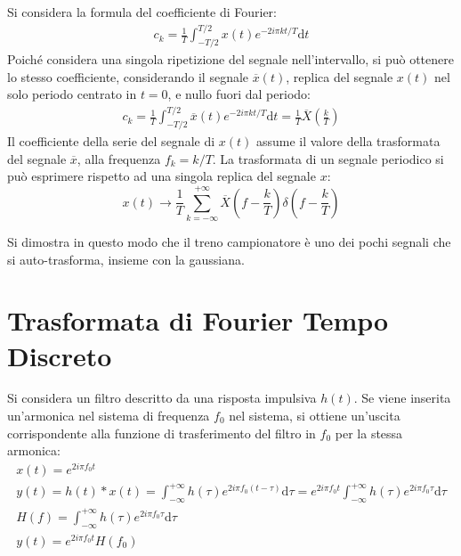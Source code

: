 \documentclass{article}
\newcommand{\df}{\mathrm{d}}
\numberwithin{equation}{subsection}
\begin{document}
Si considera la formula del coefficiente di Fourier:
\begin{gather*}
    c_k=\frac{1}{T}\displaystyle\int_{-T/2}^{T/2}x(t)e^{-2i\pi kt/T}\df t
\end{gather*}
Poiché considera una singola ripetizione del segnale nell'intervallo, si può ottenere lo stesso coefficiente, considerando il segnale $\overline x(t)$, 
replica del segnale $x(t)$ nel solo periodo centrato in $t=0$, e nullo fuori dal periodo:
\begin{gather*}
    c_k=\frac{1}{T}\displaystyle\int_{-T/2}^{T/2}\overline x(t)e^{-2i\pi kt/T}\df t=\frac{1}{T}\overline X\left(\frac{k}{T}\right)
\end{gather*}
Il coefficiente della serie del segnale di $x(t)$ assume il valore della trasformata del segnale $\overline x$, alla frequenza $f_k=k/T$. La trasformata di un segnale 
periodico si può esprimere rispetto ad una singola replica del segnale $x$:
\begin{equation}
    x(t)\to\displaystyle\frac{1}{T}\sum_{k=-\infty}^{+\infty}{\overline{X}}\left(f-\frac{k}{T}\right)\delta\left(f-\frac{k}{T}\right)
\end{equation}

Si dimostra in questo modo che il treno campionatore è uno dei pochi segnali che si auto-trasforma, insieme con la gaussiana. 

\clearpage

\section{Trasformata di Fourier Tempo Discreto}

Si considera un filtro descritto da una risposta impulsiva $h(t)$. Se viene 
inserita un'armonica nel sistema di frequenza $f_0$ nel sistema, si ottiene un'uscita corrispondente alla funzione di trasferimento del filtro in $f_0$ per la stessa 
armonica:
\begin{gather*}
    x(t)=e^{2i\pi f_0t}\\
    y(t)=h(t)*x(t)=\displaystyle\int_{-\infty}^{+\infty}h(\tau)e^{2i\pi f_0(t-\tau)}\df\tau=e^{2i\pi f_0t}\int_{-\infty}^{+\infty}h(\tau)e^{2i\pi f_0\tau}\df\tau\\
    H(f)=\displaystyle\int_{-\infty}^{+\infty}h(\tau)e^{2i\pi f_0\tau}\df\tau\\
    y(t)=e^{2i\pi f_0t}H(f_0)
\end{gather*}
\end{document}

